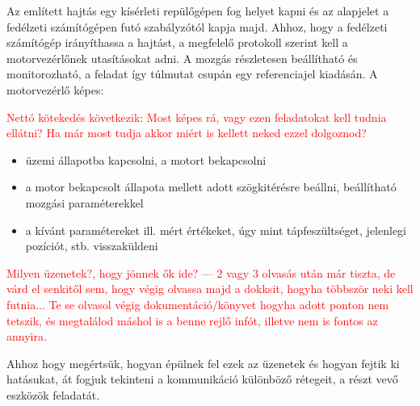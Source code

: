Az említett hajtás egy kísérleti repülőgépen fog helyet kapni és az alapjelet a fedélzeti számítógépen futó szabályzótól kapja majd. Ahhoz, hogy a fedélzeti számítógép irányíthassa a hajtást, a megfelelő protokoll szerint kell a motorvezérlőnek utasításokat adni. A mozgás részletesen beállítható és monitorozható, a feladat így túlmutat csupán egy referenciajel kiadásán. A motorvezérlő képes:

\begin{scriptsize}
\textcolor{red}{Nettó kötekedés következik: Most képes rá, vagy ezen feladatokat kell tudnia ellátni? Ha már most tudja akkor miért is kellett neked ezzel dolgoznod?
}
\end{scriptsize}


\begin{itemize}
	\item üzemi állapotba kapcsolni, a motort bekapcsolni
	\item a motor bekapcsolt állapota mellett adott szögkitérésre beállni, beállítható mozgási paraméterekkel
	\item a kívánt paramétereket ill. mért értékeket, úgy  
	 mint tápfeszültséget, jelenlegi pozíciót, stb. visszaküldeni
\end{itemize}

\begin{scriptsize}
\textcolor{red}{Milyen üzenetek?, hogy jönnek ők ide? --- 2 vagy 3 olvasás után már tiszta, de  várd el senkitől sem, hogy végig olvassa majd a dokksit, hogyha többször neki kell futnia... Te se olvasol végig dokumentáció/könyvet hogyha adott ponton nem tetszik, és megtalálod máshol is a benne rejlő infót, illetve nem is fontos az annyira.
}
\end{scriptsize}


Ahhoz hogy megértsük, hogyan épülnek fel ezek az üzenetek és hogyan fejtik ki hatásukat, át fogjuk tekinteni a kommunikáció különböző rétegeit, a részt vevő eszközök feladatát.



\begin{scriptsize}
\textcolor{red}{
}
\end{scriptsize}


\pagebreak

